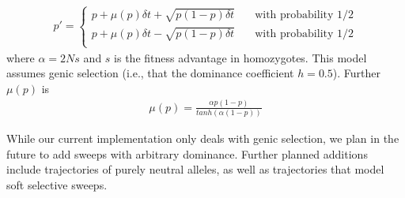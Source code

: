 \documentclass{article}
\begin{document}
\begin{eqnarray*}
	p'=\left\{ \begin{array}{ll}
	    p + \mu(p)\delta t +\sqrt{p(1-p)\delta t} & \quad \mbox{with probability $1/2$}\\
	    p + \mu(p)\delta t -\sqrt{p(1-p)\delta t} & \quad \mbox{with probability $1/2$}\\
	\end{array} \right.
\end{eqnarray*}
where $\alpha=2Ns$ and $s$ is the fitness advantage in homozygotes. This model
assumes genic selection (i.e., that the dominance coefficient $h=0.5$). Further
$\mu(p)$ is
\begin{eqnarray*}
	\mu(p)=\frac{\alpha p (1 - p)}{tanh(\alpha(1-p))}
\end{eqnarray*}

While our current implementation only deals with genic selection,
we plan in the future to add sweeps with arbitrary dominance. Further planned
additions include trajectories of purely neutral alleles, as well as trajectories
that model soft selective sweeps.
\end{document}
